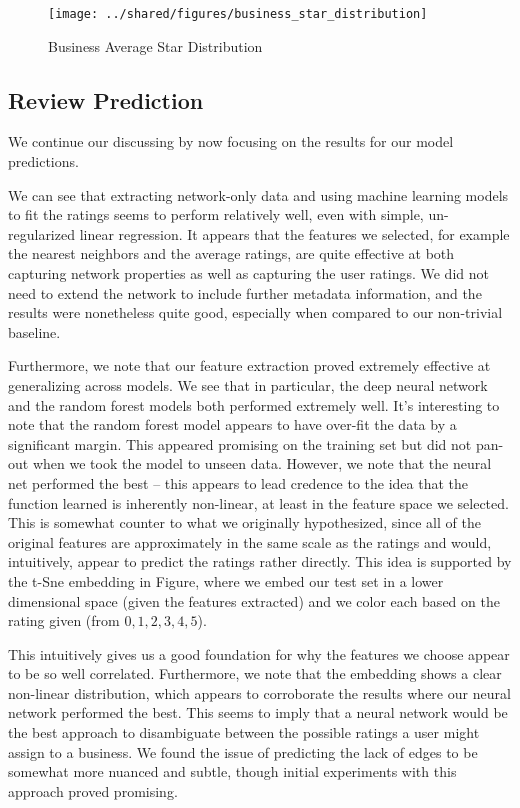 \documentclass[letterpaper, 10 pt, conference]{ieeeconf}  %
\begin{document}
\begin{figure}[h!]
\centering
\texttt{[image: ../shared/figures/business\_star\_distribution]}
\caption{Business Average Star Distribution}
\label{fig:business_star_distribution}
\end{figure}

\subsection{Review Prediction}
We continue our discussing by now focusing on the results for our model predictions.

We can see that extracting network-only data and using machine learning models to fit the ratings seems to perform relatively well, even with simple, un-regularized linear regression. It appears that the features we selected, for example the nearest neighbors and the average ratings, are quite effective at both capturing network properties as well as capturing the user ratings. We did not need to extend the network to include further metadata information, and the results were nonetheless quite good, especially when compared to our non-trivial baseline.

Furthermore, we note that our feature extraction proved extremely effective at generalizing across models. We see that in particular, the deep neural network and the random forest models both performed extremely well. It's interesting to note that the random forest model appears to have over-fit the data by a significant margin. This appeared promising on the training set but did not pan-out when we took the model to unseen data. However, we note that the neural net performed the best -- this appears to lead credence to the idea that the function learned is inherently non-linear, at least in the feature space we selected. This is somewhat counter to what we originally hypothesized, since all of the original features are approximately in the same scale as the ratings and would, intuitively, appear to predict the ratings rather directly. This idea is supported by the t-Sne embedding in Figure, where we embed our test set in a lower dimensional space (given the features extracted) and we color each based on the rating given (from $0,1,2,3,4,5$). 


This intuitively gives us a good foundation for why the features we choose appear to be so well correlated. Furthermore, we note that the embedding shows a clear non-linear distribution, which appears to corroborate the results where our neural network performed the best. This seems to imply that a neural network would be the best approach to disambiguate between the possible ratings a user might assign to a business. We found the issue of predicting the lack of edges to be somewhat more nuanced and subtle, though initial experiments with this approach proved promising.
\end{document}
